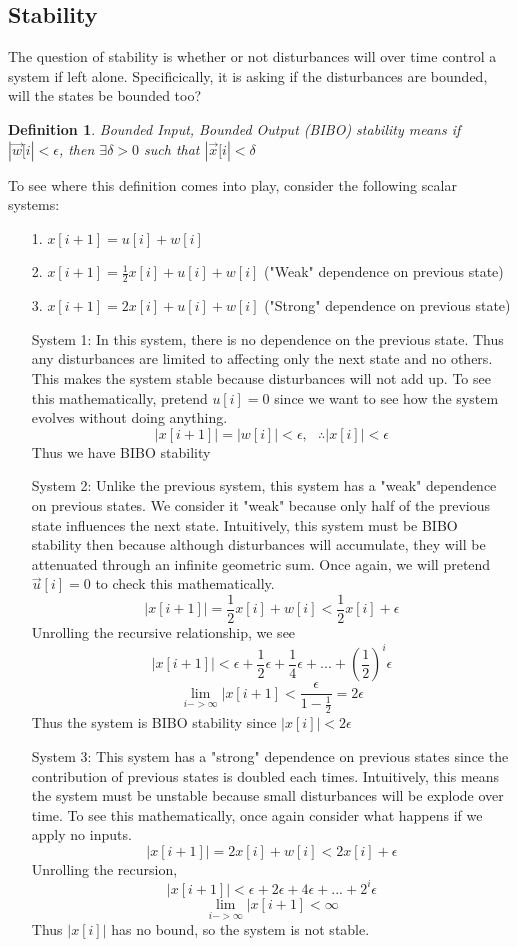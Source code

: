 \documentclass{article}
\newtheorem{definition}{Definition}
\begin{document}
\subsection{Stability}
The question of stability is whether or not disturbances will over time control a system if left alone.
Specificically, it is asking if the disturbances are bounded, will the states be bounded too?
\begin{definition}
    Bounded Input, Bounded Output (BIBO) stability means if $|\vec{w}[i| < \epsilon$, then $\exists \delta>0$ such that $|\vec{x}[i| < \delta$
\end{definition}

To see where this definition comes into play, consider the following scalar systems:
\begin{itemize}
    \item[1.] $x[i+1] = u[i] + w[i]$
    \item[2.] $x[i+1] = \frac{1}{2}x[i] + u[i]+w[i]$ ("Weak" dependence on previous state)
    \item[3.] $x[i+1] = 2 x[i]+u[i]+w[i]$ ("Strong" dependence on previous state)
\end{itemize}
\begin{itemize}
    \item[System 1:] In this system, there is no dependence on the previous state.
    Thus any disturbances are limited to affecting only the next state and no others.
    This makes the system stable because disturbances will not add up.
    To see this mathematically, pretend $u[i] = 0$ since we want to see how the system evolves without doing anything.
    $$|x[i+1]|=|w[i]| < \epsilon, \>\>\> \therefore |x[i]|<\epsilon$$
    Thus we have BIBO stability
    \item[System 2:] Unlike the previous system, this system has a "weak" dependence on previous states. We consider it "weak" because only half of the previous state influences the next state.
    Intuitively, this system must be BIBO stability then because although disturbances will accumulate, they will be attenuated through an infinite geometric sum. Once again, we will pretend $\vec{u}[i]=0$ to check this mathematically.
    $$|x[i+1]| = \frac{1}{2}x[i]+w[i] < \frac{1}{2}x[i]+ \epsilon$$
    Unrolling the recursive relationship, we see
    $$|x[i+1]| < \epsilon+\frac{1}{2}\epsilon+\frac{1}{4}\epsilon+...+\left( \frac{1}{2} \right)^i\epsilon$$
    $$\lim_{i->\infty}{|x[i+1]}<\frac{\epsilon}{1-\frac{1}{2}} = 2\epsilon$$
    Thus the system is BIBO stability since $|x[i]| < 2\epsilon$
    \item[System 3:] This system has a "strong" dependence on previous states since the contribution of previous states is doubled each times.
    Intuitively, this means the system must be unstable because small disturbances will be explode over time. To see this mathematically, once again consider what happens if we apply no inputs.
    $$|x[i+1]| = 2x[i]+w[i] < 2x[i]+ \epsilon$$
    Unrolling the recursion,
    $$|x[i+1]| < \epsilon+2\epsilon+4\epsilon+...+2^i\epsilon$$
    $$\lim_{i->\infty}{|x[i+1]} < \infty$$
    Thus $|x[i]|$ has no bound, so the system is not stable.
\end{itemize}
\end{document}
